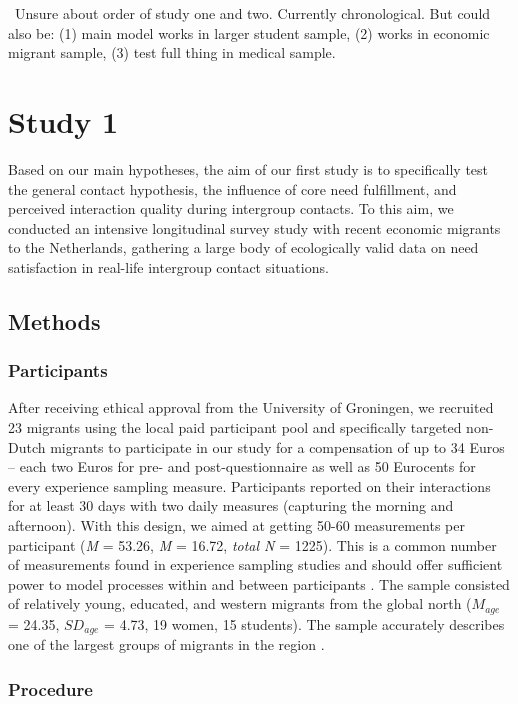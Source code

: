 \faQuestionCircle~Unsure about order of study one and two. Currently
chronological. But could also be: (1) main model works in larger student
sample, (2) works in economic migrant sample, (3) test full thing in
medical sample.

\section{Study 1}

Based on our main hypotheses, the aim of our first study is to
specifically test the general contact hypothesis, the influence of core
need fulfillment, and perceived interaction quality during intergroup
contacts. To this aim, we conducted an intensive longitudinal survey
study with recent economic migrants to the Netherlands, gathering a
large body of ecologically valid data on need satisfaction in real-life
intergroup contact situations.

\subsection{Methods}

\subsubsection{Participants}

After receiving ethical approval from the University of Groningen, we
recruited 23 migrants using the local paid participant pool and
specifically targeted non-Dutch migrants to participate in our study for
a compensation of up to 34 Euros -- each two Euros for pre- and
post-questionnaire as well as 50 Eurocents for every experience sampling
measure. Participants reported on their interactions for at least 30
days with two daily measures (capturing the morning and afternoon). With
this design, we aimed at getting 50-60 measurements per participant
(\textit{M} = 53.26, \textit{M} = 16.72, \textit{total N} = 1225). This
is a common number of measurements found in experience sampling studies
and should offer sufficient power to model processes within and between
participants \citep[e.g., for a systematic review see][]{AanhetRot2012}.
The sample consisted of relatively young, educated, and western migrants
from the global north (\(M_{age}\) = 24.35, \(SD_{age}\) = 4.73, 19
women, 15 students). The sample accurately describes one of the largest
groups of migrants in the region \citep[][]{GemeenteGroningen2015}.

\subsubsection{Procedure}

